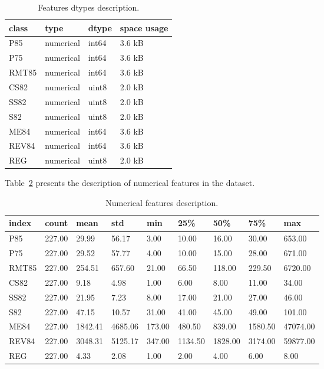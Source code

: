 \documentclass{article}%
\begin{document}
\begin{table}[H]%
\begin{center}%
\renewcommand{\arraystretch}{1.5}%
\begin{tabular}{l l l l}%
\hline%
\textbf{class}&\textbf{type}&\textbf{dtype}&\textbf{space usage}\\%
\hline%
P85&numerical&int64&3.6 kB\\%
P75&numerical&int64&3.6 kB\\%
RMT85&numerical&int64&3.6 kB\\%
CS82&numerical&uint8&2.0 kB\\%
SS82&numerical&uint8&2.0 kB\\%
S82&numerical&uint8&2.0 kB\\%
ME84&numerical&int64&3.6 kB\\%
REV84&numerical&int64&3.6 kB\\%
REG&numerical&uint8&2.0 kB\\%
\hline%
\end{tabular}%
\end{center}%
\caption{Features dtypes description.}%
\label{tab:features_dtypes}%
\end{table}

%
Table~\ref{tab:numerical_features} %
presents the description of numerical features in the dataset.%


\begin{table}[H]%
\begin{center}%
\renewcommand{\arraystretch}{1.5}%
\begin{tabular}{l l l l l l l l l}%
\hline%
\textbf{index}&\textbf{count}&\textbf{mean}&\textbf{std}&\textbf{min}&\textbf{25\%}&\textbf{50\%}&\textbf{75\%}&\textbf{max}\\%
\hline%
P85&227.00&29.99&56.17&3.00&10.00&16.00&30.00&653.00\\%
P75&227.00&29.52&57.77&4.00&10.00&15.00&28.00&671.00\\%
RMT85&227.00&254.51&657.60&21.00&66.50&118.00&229.50&6720.00\\%
CS82&227.00&9.18&4.98&1.00&6.00&8.00&11.00&34.00\\%
SS82&227.00&21.95&7.23&8.00&17.00&21.00&27.00&46.00\\%
S82&227.00&47.15&10.57&31.00&41.00&45.00&49.00&101.00\\%
ME84&227.00&1842.41&4685.06&173.00&480.50&839.00&1580.50&47074.00\\%
REV84&227.00&3048.31&5125.17&347.00&1134.50&1828.00&3174.00&59877.00\\%
REG&227.00&4.33&2.08&1.00&2.00&4.00&6.00&8.00\\%
\hline%
\end{tabular}%
\end{center}%
\caption{Numerical features description.}%
\label{tab:numerical_features}%
\end{table}
\end{document}
